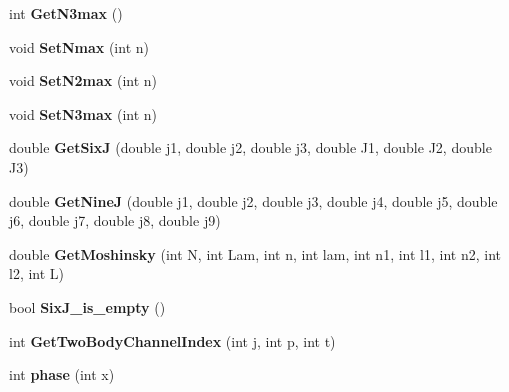 \begin{DoxyCompactItemize}
\item 
\hypertarget{classModelSpace_a15a5f8ef44f769c052ae1ae5d475fc01}{int {\bfseries Get\-N3max} ()}\label{classModelSpace_a15a5f8ef44f769c052ae1ae5d475fc01}

\item 
\hypertarget{classModelSpace_a1a50d734edaef5cb3bd79a4707ef1e82}{void {\bfseries Set\-Nmax} (int n)}\label{classModelSpace_a1a50d734edaef5cb3bd79a4707ef1e82}

\item 
\hypertarget{classModelSpace_ab13111671fc76cf1c52b98a3f78a1dcd}{void {\bfseries Set\-N2max} (int n)}\label{classModelSpace_ab13111671fc76cf1c52b98a3f78a1dcd}

\item 
\hypertarget{classModelSpace_a432f3913aa487bf7fc7c4eb5a2197599}{void {\bfseries Set\-N3max} (int n)}\label{classModelSpace_a432f3913aa487bf7fc7c4eb5a2197599}

\item 
\hypertarget{classModelSpace_a716c2bf4a6b42c1c27579b0b7804252e}{double {\bfseries Get\-Six\-J} (double j1, double j2, double j3, double J1, double J2, double J3)}\label{classModelSpace_a716c2bf4a6b42c1c27579b0b7804252e}

\item 
\hypertarget{classModelSpace_ab9303a5a0cc4513bf4ed4430d9fe86a6}{double {\bfseries Get\-Nine\-J} (double j1, double j2, double j3, double j4, double j5, double j6, double j7, double j8, double j9)}\label{classModelSpace_ab9303a5a0cc4513bf4ed4430d9fe86a6}

\item 
\hypertarget{classModelSpace_a85f0b95b2cd46504702ea80489455beb}{double {\bfseries Get\-Moshinsky} (int N, int Lam, int n, int lam, int n1, int l1, int n2, int l2, int L)}\label{classModelSpace_a85f0b95b2cd46504702ea80489455beb}

\item 
\hypertarget{classModelSpace_aae435e6ade2addd7787e7948a3ae542c}{bool {\bfseries Six\-J\-\_\-is\-\_\-empty} ()}\label{classModelSpace_aae435e6ade2addd7787e7948a3ae542c}

\item 
\hypertarget{classModelSpace_ae73e211248e6f2bd4cc1bb0f030144ce}{int {\bfseries Get\-Two\-Body\-Channel\-Index} (int j, int p, int t)}\label{classModelSpace_ae73e211248e6f2bd4cc1bb0f030144ce}

\item 
\hypertarget{classModelSpace_a6b4d1686088e3fef492df10bbd806fe2}{int {\bfseries phase} (int x)}\label{classModelSpace_a6b4d1686088e3fef492df10bbd806fe2}


\end{DoxyCompactItemize}
